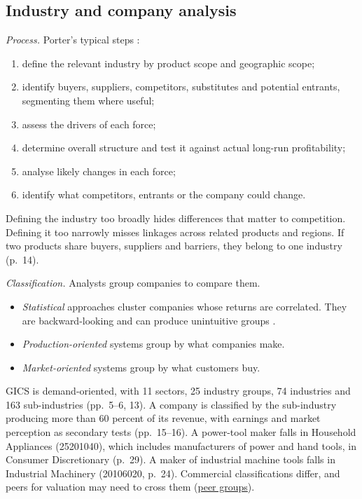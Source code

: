 \subsection{Industry and company analysis}

\begin{qfmethod}\label{meth:industry-analysis}
 \emph{Process.} Porter's typical steps \citep[p.~15]{five-competitive-forces-2008}:
\begin{enumerate}
\item define the relevant industry by product scope and geographic scope;
\item identify buyers, suppliers, competitors, substitutes and potential entrants, segmenting them where useful;
\item assess the drivers of each force;
\item determine overall structure and test it against actual long-run profitability;
\item analyse likely changes in each force;
\item identify what competitors, entrants or the company could change.
\end{enumerate}
Defining the industry too broadly hides differences that matter to competition. Defining it too narrowly misses linkages across related products and regions. If two products share buyers, suppliers and barriers, they belong to one industry (p.~14).

\emph{Classification.} Analysts group companies to compare them.
\begin{itemize}
\item \emph{Statistical} approaches cluster companies whose returns are correlated. They are backward-looking and can produce unintuitive groups \citep[p.~13]{gics-methodology-2023}.
\item \emph{Production-oriented} systems group by what companies make.
\item \emph{Market-oriented} systems group by what customers buy.
\end{itemize}
GICS is demand-oriented, with 11 sectors, 25 industry groups, 74 industries and 163 sub-industries (pp.~5--6, 13). A company is classified by the sub-industry producing more than 60 percent of its revenue, with earnings and market perception as secondary tests (pp.~15--16). A power-tool maker falls in Household Appliances (25201040), which includes manufacturers of power and hand tools, in Consumer Discretionary (p.~29). A maker of industrial machine tools falls in Industrial Machinery (20106020, p.~24). Commercial classifications differ, and peers for valuation may need to cross them (\hyperref[meth:peer-group-selection]{peer groups}).


\end{qfmethod}
